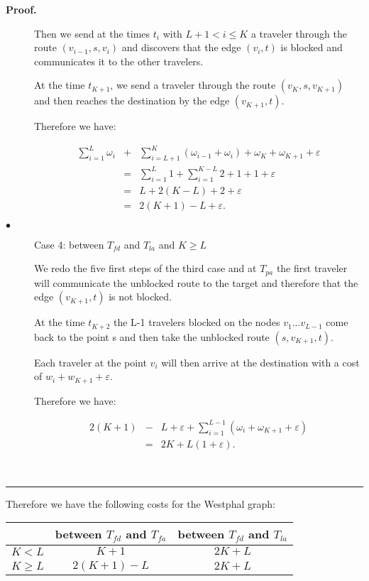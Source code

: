 \documentclass[letter-size, 11pt]{article}
\newenvironment{proof}[1][Proof]{\textbf{#1.} }{\ \rule{0.5em}{0.5em}}
\begin{document}
\begin{proof}
\begin{description}
Then we send at the times $t_i$ with $L+1 < i \leq K$ a traveler through the route $(v_{i-1},s,v_i)$ and discovers that the edge $(v_i,t)$ is blocked and communicates it to the other travelers.

At the time $t_{K+1}$, we send a traveler through the route $(v_K,s,v_{K+1})$ and then reaches the destination by the edge $(v_{K+1},t)$. 

Therefore we have: 

\begin{eqnarray}
\sum_{i=1}^{L} \omega_{i} &+& \sum_{i=L+1}^{K}(\omega_{i-1} + \omega_{i} ) + \omega_{K} + \omega_{K+1} + \varepsilon  \nonumber\\
&=&\sum_{i=1}^{L} 1 + \sum_{i=1}^{K-L}2 + 1 + 1 + \varepsilon\nonumber \\
&=& L + 2(K - L) + 2 + \varepsilon \nonumber\\
&=& 2(K + 1 ) - L + \varepsilon.\nonumber
\end{eqnarray}

\item[$\bullet$] Case 4: between $T_{fd}$ and $T_{la}$ and $K \geq L$

We redo the five first steps of the third case and at $ T_{pa}$ the first traveler will communicate the unblocked route to the target and therefore that the edge $(v_{K+1},t)$ is not blocked.

At the time $t_{K+2}$ the L-1 travelers blocked on the nodes $v_{1} ... v_{L-1} $ come back to the point s and then take the unblocked route $(s,v_{K+1},t)$.

Each traveler at the point $v_i$ will then arrive at the destination with a cost of $w_i + w_{K+1} + \varepsilon$. 

Therefore we have:

\begin{eqnarray}
2(K + 1) & - & L + \varepsilon + \sum_{i=1}^{L-1}(\omega_{i} + \omega_{K+1} + \varepsilon ) \nonumber\\
& = & 2K + L(1+\varepsilon).\nonumber
\end{eqnarray}


\end{description}
\end{proof}

Therefore we have the following costs for the Westphal graph:

\begin{center}
\begin{tabular}{|c|c|c|}
\hline
 & between $T_{fd}$ and $T_{fa}$  & between $T_{fd}$ and $ T_{la}$ \\ 
\hline
 ${K<L}$  & ${K + 1}$ & ${ 2K + L}$   \\ 
\hline
 ${K \geq L}$  & ${2(K+1) - L}$ & ${2K + L}$   \\ 
\hline
\end{tabular}
\end{center}
\end{document}
